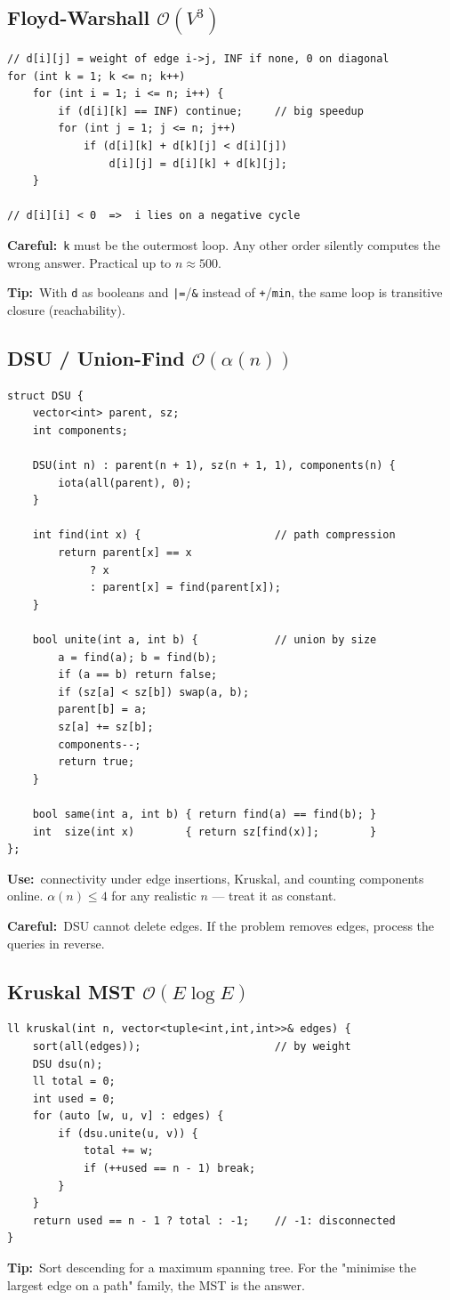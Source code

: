 \documentclass[10pt]{article}
\newcommand{\code}[1]{\texttt{\small #1}}
\newcommand{\sub}[2]{\subsection[#1]{#1\hspace{0.6em}%
  \textnormal{\color{accent2}\small$\mathcal{O}(#2)$}}}
\newcommand{\uses}[1]{{\color{accent2}\footnotesize\textbf{Use:}}~{\footnotesize #1}\par}
\newcommand{\tip}[1]{{\color{tipc}\footnotesize\textbf{Tip:}}~{\footnotesize #1}\par}
\newcommand{\warn}[1]{{\color{warnc}\footnotesize\textbf{Careful:}}~{\footnotesize #1}\par}
\begin{document}
\begin{multicols}{2}
\sub{Floyd-Warshall}{V^3}
\begin{lstlisting}
// d[i][j] = weight of edge i->j, INF if none, 0 on diagonal
for (int k = 1; k <= n; k++)
    for (int i = 1; i <= n; i++) {
        if (d[i][k] == INF) continue;     // big speedup
        for (int j = 1; j <= n; j++)
            if (d[i][k] + d[k][j] < d[i][j])
                d[i][j] = d[i][k] + d[k][j];
    }

// d[i][i] < 0  =>  i lies on a negative cycle
\end{lstlisting}
\warn{\code{k} must be the outermost loop. Any other order silently
computes the wrong answer. Practical up to $n \approx 500$.}
\tip{With \code{d} as booleans and \code{|=}/\code{\&} instead of
\code{+}/\code{min}, the same loop is transitive closure
(reachability).}

\sub{DSU / Union-Find}{\alpha(n)}
\begin{lstlisting}
struct DSU {
    vector<int> parent, sz;
    int components;

    DSU(int n) : parent(n + 1), sz(n + 1, 1), components(n) {
        iota(all(parent), 0);
    }

    int find(int x) {                     // path compression
        return parent[x] == x
             ? x
             : parent[x] = find(parent[x]);
    }

    bool unite(int a, int b) {            // union by size
        a = find(a); b = find(b);
        if (a == b) return false;
        if (sz[a] < sz[b]) swap(a, b);
        parent[b] = a;
        sz[a] += sz[b];
        components--;
        return true;
    }

    bool same(int a, int b) { return find(a) == find(b); }
    int  size(int x)        { return sz[find(x)];        }
};
\end{lstlisting}
\uses{connectivity under edge insertions, Kruskal, and counting
components online. $\alpha(n) \le 4$ for any realistic $n$ --- treat it
as constant.}
\warn{DSU cannot delete edges. If the problem removes edges, process
the queries in reverse.}

\sub{Kruskal MST}{E \log E}
\begin{lstlisting}
ll kruskal(int n, vector<tuple<int,int,int>>& edges) {
    sort(all(edges));                     // by weight
    DSU dsu(n);
    ll total = 0;
    int used = 0;
    for (auto [w, u, v] : edges) {
        if (dsu.unite(u, v)) {
            total += w;
            if (++used == n - 1) break;
        }
    }
    return used == n - 1 ? total : -1;    // -1: disconnected
}
\end{lstlisting}
\tip{Sort descending for a maximum spanning tree. For the "minimise the
largest edge on a path" family, the MST is the answer.}


\end{multicols}
\end{document}
